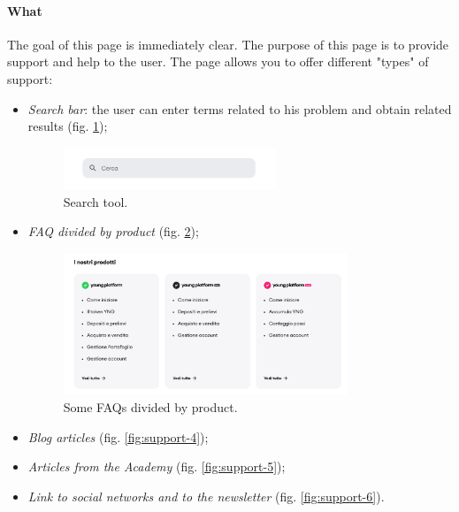 \paragraph{What}

The goal of this page is immediately clear. The purpose of this page is to 
provide support and help to the user. The page allows you to offer 
different "types" of support:
\begin{itemize}
  \item \textit{Search bar}: the user can enter terms related to his 
  problem and obtain related results (fig. \ref{fig:support-2});

  \begin{figure}[H]
    \centering
    \includegraphics[width=0.60\textwidth]{res/images/internal-pages/support/support-2.png}
    \caption{Search tool.}
    \label{fig:support-2}
  \end{figure}
  
  \item \textit{FAQ divided by product} (fig. \ref{fig:support-3});
  
  \begin{figure}[H]
    \centering
    \includegraphics[width=0.80\textwidth]{res/images/internal-pages/support/support-3.png}
    \caption{Some FAQs divided by product.}
    \label{fig:support-3}
  \end{figure}
  
  \item \textit{Blog articles} (fig. \ref{fig:support-4});
  
  \item \textit{Articles from the Academy} (fig. \ref{fig:support-5});
  
  \item \textit{Link to social networks and to the newsletter} 
  (fig. \ref{fig:support-6}).
\end{itemize}

